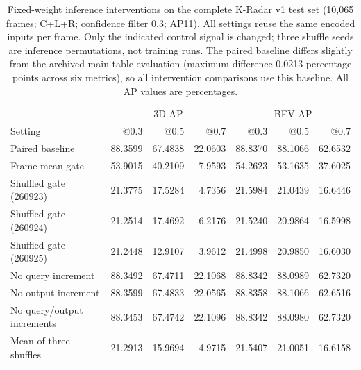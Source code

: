 \begin{table}[tbp]
\centering
\caption{Fixed-weight inference interventions on the complete K-Radar v1 test set (10,065 frames; C+L+R; confidence filter 0.3; AP11). All settings reuse the same encoded inputs per frame. Only the indicated control signal is changed; three shuffle seeds are inference permutations, not training runs. The paired baseline differs slightly from the archived main-table evaluation (maximum difference 0.0213 percentage points across six metrics), so all intervention comparisons use this baseline. All AP values are percentages.}
\label{tab:d2}
\begingroup
\scriptsize
\setlength{\tabcolsep}{3pt}
\begin{tabular}{@{}lrrrrrr@{}}
\toprule
& \multicolumn{3}{c}{3D AP} & \multicolumn{3}{c}{BEV AP} \\
Setting & @0.3 & @0.5 & @0.7 & @0.3 & @0.5 & @0.7 \\
\midrule
Paired baseline & 88.3599 & 67.4838 & 22.0603 & 88.8370 & 88.1066 & 62.6532 \\
Frame-mean gate & 53.9015 & 40.2109 & 7.9593 & 54.2623 & 53.1635 & 37.6025 \\
Shuffled gate (260923) & 21.3775 & 17.5284 & 4.7356 & 21.5984 & 21.0439 & 16.6446 \\
Shuffled gate (260924) & 21.2514 & 17.4692 & 6.2176 & 21.5240 & 20.9864 & 16.5998 \\
Shuffled gate (260925) & 21.2448 & 12.9107 & 3.9612 & 21.4998 & 20.9850 & 16.6030 \\
No query increment & 88.3492 & 67.4711 & 22.1068 & 88.8342 & 88.0989 & 62.7320 \\
No output increment & 88.3599 & 67.4833 & 22.0565 & 88.8358 & 88.1066 & 62.6516 \\
No query/output increments & 88.3453 & 67.4742 & 22.1096 & 88.8342 & 88.0980 & 62.7320 \\
Mean of three shuffles & 21.2913 & 15.9694 & 4.9715 & 21.5407 & 21.0051 & 16.6158 \\
\bottomrule
\end{tabular}
\endgroup
\end{table}
